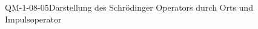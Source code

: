 
\begin{REM}{QM-1-08-05}{Darstellung des Schrödinger Operators durch Orts und Impulsoperator}
\end{REM}
